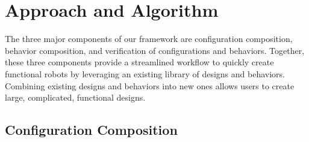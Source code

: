 \documentclass[graybox]{svmult}
\begin{document}
% 

\section{Approach and Algorithm} \label{sec:approach} The three major
components of our framework are configuration composition, behavior
composition, and verification of configurations and behaviors.  Together,
these three components provide a streamlined workflow to quickly create
functional robots by leveraging an existing library of designs and behaviors.
Combining existing designs and behaviors into new ones allows users to create
large, complicated, functional designs.

\subsection{Configuration Composition} \label{sec:conf_composition}
\end{document}
